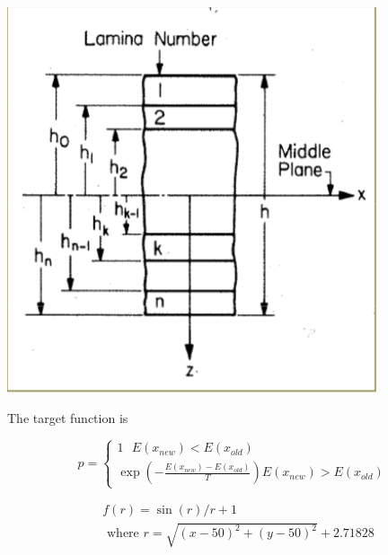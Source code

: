 \documentclass[smallextended]{svjour3}       %
\begin{document}
\begin{center}
  \includegraphics[width=\linewidth]{laminate.jpg}
\end{center}



The target function is 


\begin{equation}
p=\left\{
    \begin{array}{c}{1}  
        \text{      }   E\left(x_{n e w}\right)<E\left(x_{o l d}\right)
        \\ 
{\exp \left(-\frac{E\left(x_{new}\right)-E\left(x_{old}\right)}{T}\right)}
                        E\left(x_{n e w}\right)>E\left(x_{o l d}\right)
\end{array}\right.
\end{equation}


\begin{equation*}
    \begin{split}
        &f(r)=\sin(r)/r + 1  \\
             &\text{ where  } r=\sqrt{(x-50)^2+(y-50)^2}+2.71828
    \end{split}
\end{equation*}
\end{document}
